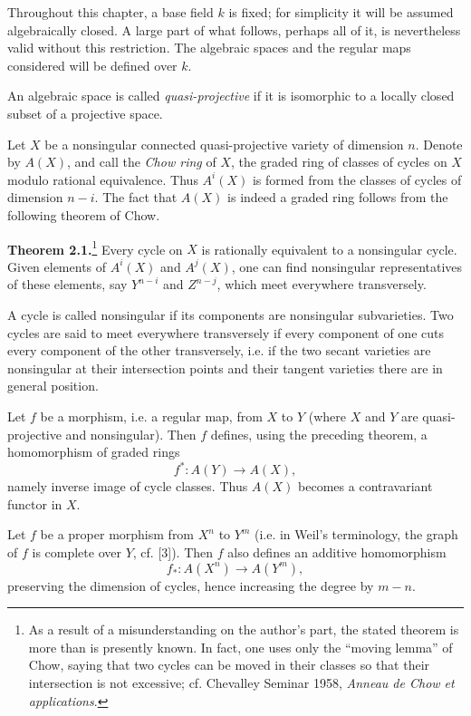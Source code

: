 Throughout this chapter, a base field $k$ is fixed; for simplicity it will be assumed algebraically closed. A large part of what follows, perhaps all of it, is nevertheless valid without this restriction. The algebraic spaces and the regular maps considered will be defined over $k$.

An algebraic space is called \emph{quasi-projective} if it is isomorphic to a locally closed subset of a projective space.

Let $X$ be a nonsingular connected quasi-projective variety of dimension $n$. Denote by $A(X)$, and call the \emph{Chow ring} of $X$, the graded ring of classes of cycles on $X$ modulo rational equivalence. Thus $A^i(X)$ is formed from the classes of cycles of dimension $n-i$. The fact that $A(X)$ is indeed a graded ring follows from the following theorem of Chow.

\textbf{Theorem 2.1.}\footnote{As a result of a misunderstanding on the author's part, the stated theorem is more than is presently known. In fact, one uses only the ``moving lemma'' of Chow, saying that two cycles can be moved in their classes so that their intersection is not excessive; cf. Chevalley Seminar 1958, \emph{Anneau de Chow et applications}.} Every cycle on $X$ is rationally equivalent to a nonsingular cycle. Given elements of $A^i(X)$ and $A^j(X)$, one can find nonsingular representatives of these elements, say $Y^{n-i}$ and $Z^{n-j}$, which meet everywhere transversely.

A cycle is called nonsingular if its components are nonsingular subvarieties. Two cycles are said to meet everywhere transversely if every component of one cuts every component of the other transversely, i.e. if the two secant varieties are nonsingular at their intersection points and their tangent varieties there are in general position.

Let $f$ be a morphism, i.e. a regular map, from $X$ to $Y$ (where $X$ and $Y$ are quasi-projective and nonsingular). Then $f$ defines, using the preceding theorem, a homomorphism of graded rings
\begin{equation}\tag{2.1}
f^*:A(Y)\longrightarrow A(X),
\end{equation}
namely inverse image of cycle classes. Thus $A(X)$ becomes a contravariant functor in $X$.

Let $f$ be a proper morphism from $X^n$ to $Y^m$ (i.e. in Weil's terminology, the graph of $f$ is complete over $Y$, cf. [3]). Then $f$ also defines an additive homomorphism
\begin{equation}\tag{2.2}
f_*:A(X^n)\longrightarrow A(Y^m),
\end{equation}
preserving the dimension of cycles, hence increasing the degree by $m-n$.




